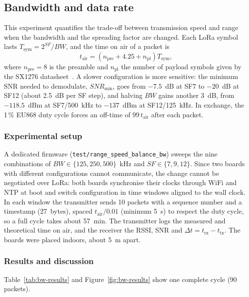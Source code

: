 \documentclass[informe,english]{plantilla}
\begin{document}
\subsection{Bandwidth and data rate}
\label{sec:exp-bw}

This experiment quantifies the trade-off between transmission speed and range when the bandwidth and the spreading factor are changed. Each LoRa symbol lasts $T_{\text{sym}} = 2^{SF}/BW$, and the time on air of a packet is
\begin{equation}
    t_{\text{air}} = \left(n_{\text{pre}} + 4.25 + n_{\text{pl}}\right) T_{\text{sym}},
    \label{eq:toa}
\end{equation}
where $n_{\text{pre}} = 8$ is the preamble and $n_{\text{pl}}$ the number of payload symbols given by the SX1276 datasheet~\cite{sx1276}. A slower configuration is more sensitive: the minimum SNR needed to demodulate, $SNR_{\min}$, goes from $-7.5$~dB at SF7 to $-20$~dB at SF12 (about 2.5~dB per SF step), and halving $BW$ gains another 3~dB, from $-118.5$~dBm at SF7/500~kHz to $-137$~dBm at SF12/125~kHz. In exchange, the 1\,\% EU868 duty cycle forces an off-time of $99\,t_{\text{air}}$ after each packet.

\subsubsection{Experimental setup}

A dedicated firmware (\texttt{test/range\_speed\_balance\_bw}) sweeps the nine combinations of $BW \in \{125, 250, 500\}$~kHz and $SF \in \{7, 9, 12\}$. Since two boards with different configurations cannot communicate, the change cannot be negotiated over LoRa: both boards synchronise their clocks through WiFi and NTP at boot and switch configuration in time windows aligned to the wall clock. In each window the transmitter sends 10 packets with a sequence number and a timestamp (27~bytes), spaced $t_{\text{air}}/0.01$ (minimum 5~s) to respect the duty cycle, so a full cycle takes about 57~min. The transmitter logs the measured and theoretical time on air, and the receiver the RSSI, SNR and $\Delta t = t_{\text{rx}} - t_{\text{tx}}$. The boards were placed indoors, about 5~m apart.

\subsubsection{Results and discussion}

Table~\ref{tab:bw-results} and Figure~\ref{fig:bw-results} show one complete cycle (90 packets).
\end{document}
